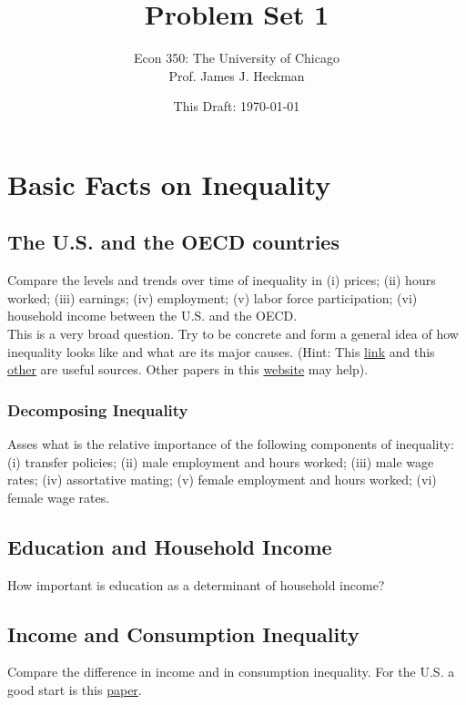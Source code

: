



\title{\textbf{Problem Set 1}}
\author{Econ 350: The University of Chicago \\ Prof. James J. Heckman}
\date{This Draft: \today}
\maketitle

\section{Basic Facts on Inequality}
\subsection{The U.S. and the OECD countries}
\noindent Compare the levels and trends over time of inequality in (i) prices; (ii) hours worked; (iii) earnings; (iv) employment; (v) labor force participation; (vi) household income between the U.S. and the OECD.\\ 
\indent This is a very broad question. Try to be concrete and form a general idea of how inequality looks like and what are its major causes. (Hint: This \href{http://jenni.uchicago.edu/econ350/slides/wage-ed-facts_ECON-350_2013-01-14a_jsw.pdf}{link} and this \href{http://www.oecd-ilibrary.org.proxy.uchicago.edu/social-issues-migration-health/the-causes-of-growing-inequalities-in-oecd-countries_9789264119536-en}{other} are useful sources. Other papers in this \href{https://heckman.uchicago.edu/page/economics-350}{website} may help). 
\subsubsection{Decomposing Inequality}
Asses what is the relative importance of the following components of inequality: (i) transfer policies; (ii) male employment and hours worked; (iii) male wage rates; (iv) assortative mating; (v) female employment and hours worked; (vi) female wage rates.\\
\subsection{Education and Household Income}
\noindent How important is education as a determinant of household income?
\subsection{Income and Consumption Inequality}
Compare the difference in income and in consumption inequality. For the U.S. a good start is this \href{http://jenni.uchicago.edu/econ350/papers/Meyer_Sullivan_2012_AEIMonograph4-3.pdf}{paper}.
